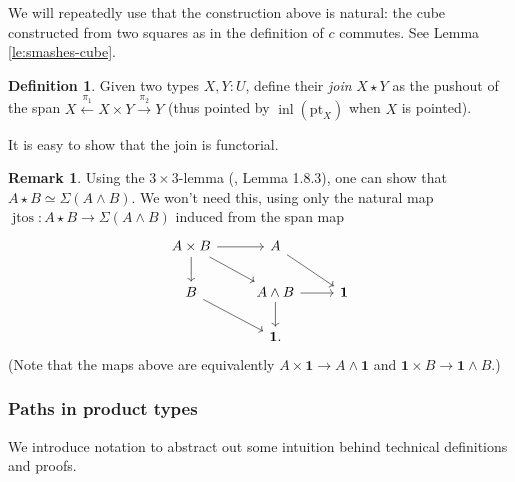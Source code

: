 \documentclass{amsart}
\theoremstyle{definition}
\newtheorem{de}[theorem]{Definition}
\newtheorem{re}[theorem]{Remark}
\newcommand{\inl}{\operatorname{inl}}
\newcommand{\bs}[1]{\mathrm{pt}_{#1}}
\newcommand{\sgtn}{\mathbf{1}}
\newcommand{\jtos}{\operatorname{jtos}}
\newcommand{\join}{\star}
\begin{document}
We will repeatedly use that the construction above is natural: the cube constructed from two squares as in the definition of $c$ commutes. See Lemma \ref{le:smashes-cube}.

\begin{de}
    Given two types $X, Y: U$, define their \textit{join} $X \join Y$ as the pushout of the span $X \xleftarrow{\pi_1} X \times Y \xrightarrow{\pi_2} Y$ (thus pointed by $\inl(\bs{X})$ when $X$ is pointed).
\end{de}

It is easy to show that the join is functorial.

\begin{re}
    Using the $3 \times 3$-lemma (\cite{Bru}, Lemma 1.8.3), one can show that $A \join B \simeq \Sigma (A \wedge B)$. We won't need this, using only the natural map $\jtos: A \join B \to \Sigma (A \wedge B)$ induced from the span map
    \[\begin{tikzcd}
    	{A \times B} & A \\
    	B & {A \wedge B} & \sgtn \\
    	& {\sgtn.}
    	\arrow[from=1-1, to=1-2]
    	\arrow[from=1-1, to=2-1]
    	\arrow[from=1-1, to=2-2]
    	\arrow[from=1-2, to=2-3]
    	\arrow[from=2-1, to=3-2]
    	\arrow[from=2-2, to=2-3]
    	\arrow[from=2-2, to=3-2]
    \end{tikzcd}\]
    (Note that the maps above are equivalently $A \times \sgtn \to A \wedge \sgtn$ and $\sgtn \times B \to \sgtn\wedge B$.)
\end{re}

\subsubsection{Paths in product types}\label{sec:paths-in-prod}

We introduce notation to abstract out some intuition behind technical definitions and proofs.
\end{document}
